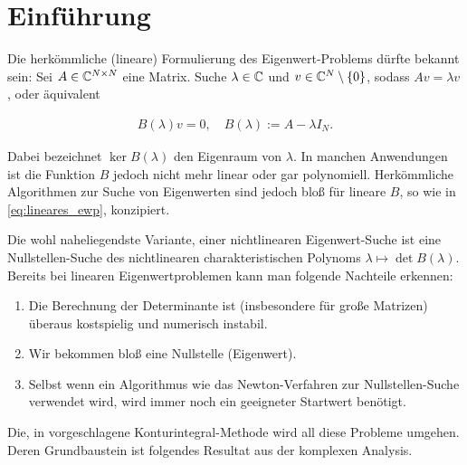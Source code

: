 \section{Einführung}

Die herkömmliche (lineare) Formulierung des Eigenwert-Problems dürfte bekannt sein:
Sei $A \in \mathbb{C}^{N \times N}$ eine Matrix.
Suche $\lambda \in \mathbb{C}$ und $v \in \mathbb{C}^N \setminus {\left \{ 0 \right \}}$, sodass $A v = \lambda v$, oder
äquivalent

\begin{align} \label{eq:lineares_ewp}
    B(\lambda) v = 0,
    \quad
    B(\lambda) := A - \lambda I_N.
\end{align}

Dabei bezeichnet $\ker B(\lambda)$ den Eigenraum von $\lambda$.
In manchen Anwendungen ist die Funktion $B$ jedoch nicht mehr linear oder gar polynomiell.
Herkömmliche Algorithmen zur Suche von Eigenwerten sind jedoch bloß für lineare $B$, so wie in \eqref{eq:lineares_ewp}, konzipiert.

Die wohl naheliegendste Variante, einer nichtlinearen Eigenwert-Suche ist eine Nullstellen-Suche
des nichtlinearen charakteristischen Polynoms $\lambda \mapsto \det B(\lambda)$.
Bereits bei linearen Eigenwertproblemen kann man folgende Nachteile erkennen:

\begin{enumerate}[label = \arabic*.]
    \item Die Berechnung der Determinante ist (insbesondere für große Matrizen) überaus kostspielig
    und numerisch instabil.
    \item Wir bekommen bloß eine Nullstelle (Eigenwert).
    \item Selbst wenn ein Algorithmus wie das Newton-Verfahren zur Nullstellen-Suche verwendet wird, wird immer noch ein geeigneter Startwert benötigt.
\end{enumerate}

Die, in \cite{BEYN20123839} vorgeschlagene Konturintegral-Methode wird all diese Probleme umgehen.
Deren Grundbaustein ist folgendes Resultat aus der komplexen Analysis.
